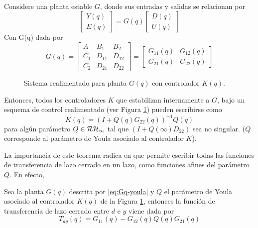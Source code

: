 \begin{teo}{\ \\}
Considere una planta estable $G$, donde sus entradas y salidas se relacionan por
\begin{equation}
\left[\begin{array}{cc}Y(q)\\E(q)\end{array}\right]=G(q)\left[\begin{array}{cc}D(q)\\U(q)\end{array}\right]
\end{equation}
Con G(q) dada por
\begin{equation}\label{eq:Gq-youla}
G(q)=\left[\begin{array}{c|cc}A&B_1&B_2\\ \hline C_1&D_{11}&D_{12}\\ C_2 & D_{21} & D_{22}\end{array}\right]=\left[\begin{array}{cc}G_{11}(q)&G_{12}(q)\\G_{21}(q)&G_{22}(q)\end{array}\right]
\end{equation}

\begin{figure}[htbp]
\centering
\scalebox{0.65}{}
\caption{Sistema realimentado para planta $G(q)$ con controlador $K(q)$.}
\label{fig:fb-youla}
\end{figure}
Entonces, todos los controladores $K$ que estabilizan internamente a $G$, bajo un esquema de control realimentado (ver Figura \ref{fig:fb-youla}) pueden escribirse como
\begin{equation}
K(q)=\left( I+Q(q)G_{22}(q)\right)^{-1}Q(q)
\end{equation}
para alg\'un par\'ametro $Q \in \cal{RH}_{\infty}$ tal que $\left(I+Q(\infty)D_{22}\right)$ sea no singular. ($Q$ corresponde al par\'ametro de Youla asociado al controlador $K$).
\QED
\end{teo}
La importancia de este teorema radica en que permite escribir todas las funciones de transferencia de lazo cerrado en un lazo, como funciones afines del par\'ametro $Q$. En efecto,
\begin{coro}
Sea la planta $G(q)$ descrita por \eqref{eq:Gq-youla} y $Q$ el par\'ametro de Youla asociado al controlador $K(q)$ de la Figura \ref{fig:fb-youla}, entonces la funci\'on de transferencia de lazo cerrado entre $d$ e $y$ viene dada por
\begin{equation}
T_{dy}(q)=G_{11}(q)-G_{12}(q)Q(q)G_{21}(q)
\end{equation}\QED
\end{coro}

